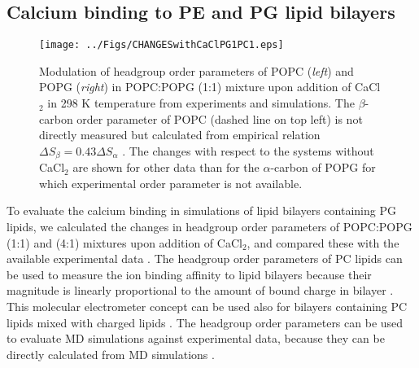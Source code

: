 \documentclass[aps,prl,superscriptaddress,twocolumn]{revtex4}
\begin{document}
\clearpage
\subsection{Calcium binding to PE and PG lipid bilayers}
\begin{figure*}[bt]
  \centering
  \texttt{[image: ../Figs/CHANGESwithCaClPG1PC1.eps]}
  \caption{\label{changesWITHCaClPG}
    Modulation of headgroup order parameters of POPC ({\it left}) and POPG ({\it right}) in POPC:POPG (1:1)
    mixture upon addition of CaCl$_2$ in 298 K temperature from experiments \cite{borle85,macdonald87} and simulations.
    The $\beta$-carbon order parameter of POPC (dashed line on top left) is not directly measured but
    calculated from empirical relation $\Delta S_{\beta}=0.43\Delta S_{\alpha}$ \cite{akutsu81}.
    The changes with respect to the systems without CaCl$_2$ are shown for other data than
    for the $\alpha$-carbon of POPG for which experimental order parameter is not available.
  }
\end{figure*}

To evaluate the calcium binding in simulations of lipid bilayers containing PG lipids,
we calculated the changes in headgroup order parameters of POPC:POPG (1:1) and (4:1) mixtures
upon addition of CaCl$_2$, and compared these with the available experimental data \cite{borle85,macdonald87}.
The headgroup order parameters of PC lipids can be used to measure the ion binding
affinity to lipid bilayers because their magnitude is linearly proportional to the amount of bound charge in bilayer \cite{seelig87,catte16}.
This molecular electrometer concept can be used also for bilayers containing PC lipids mixed with charged lipids \cite{borle85,macdonald87,roux90,antila19}.
The headgroup order parameters can be used to evaluate MD simulations against experimental data,
because they can be directly calculated from MD simulations \cite{catte16}.
\end{document}
